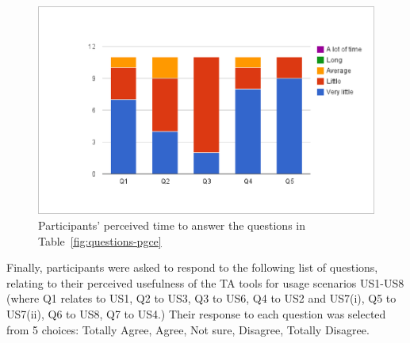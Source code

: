\begin{figure}[htbp]
  \centering
    \includegraphics[width=\textwidth]{gfx/perceived-time-Q1-Q5.eps}
  \caption{Participants' perceived time to answer the questions in
Table~\ref{fig:questions-pgce}} 
\label{fig:perceived-time}
\end{figure}


Finally, participants were asked to respond to the following list of
questions, relating to their perceived usefulness of the TA tools for
usage scenarios US1-US8 (where Q1 relates to US1, Q2 to US3, Q3 to
US6, Q4 to US2 and US7(i), Q5 to US7(ii), Q6 to US8, Q7 to US4.) Their
response to each question was selected from 5 choices: Totally Agree,
Agree, Not sure, Disagree, Totally Disagree.

